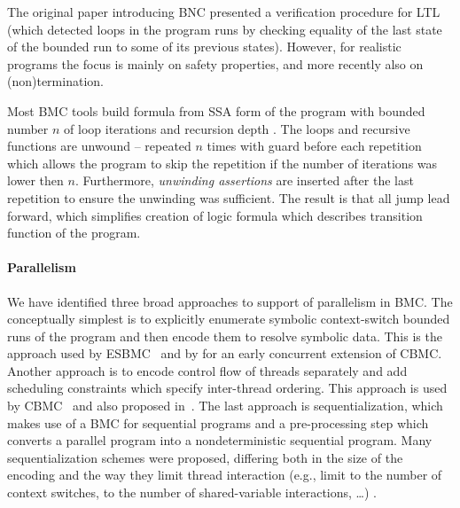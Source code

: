The original paper introducing BNC presented a verification procedure for LTL
(which detected loops in the program runs by checking equality of the last
state of the bounded run to some of its previous states).
However, for realistic programs the focus is mainly on safety properties, and
more recently also on (non)termination.

Most BMC tools build formula from SSA form of the program with bounded number $n$ of loop iterations and recursion depth .
The loops and recursive functions are unwound -- repeated $n$ times with guard before each repetition which allows the program to skip the repetition if the number of iterations was lower then $n$.
Furthermore, \emph{unwinding assertions} are inserted after the last repetition to ensure the unwinding was sufficient.
The result is that all jump lead forward, which simplifies creation of logic formula which describes transition function of the program.

\paragraph{Parallelism}

We have identified three broad approaches to support of parallelism in BMC.
The conceptually simplest is to explicitly enumerate symbolic context-switch
bounded runs of the program and then encode them to resolve symbolic data.
This is the approach used by ESBMC~ and by
 for an early concurrent extension of CBMC.
Another approach is to encode control flow of threads separately and add scheduling constraints which specify inter-thread ordering.
This approach is used by CBMC~ and also proposed in~.
The last approach is sequentialization, which makes use of a BMC for sequential programs and a pre-processing step which converts a parallel program into a nondeterministic sequential program.
Many sequentialization schemes were proposed, differing both in the size of the encoding and the way they limit thread interaction (e.g., limit to the number of context switches, to the number of shared-variable interactions, …) .

